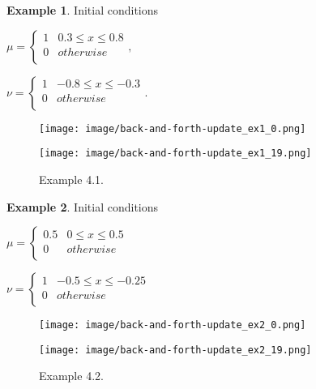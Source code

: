 \documentclass[a4j,10pt, twocolumn, dvipdfmx]{article}
\theoremstyle{definition}
\newtheorem{ex}{Example}[section]
\begin{document}
\begin{ex}
    Initial conditions

    $\mu = \left\{
        \begin{array}{ll}
            1 & 0.3 \le x \le 0.8\\
            0 & otherwise \\
        \end{array},
    \right.
    $

    $\nu = \left\{
        \begin{array}{ll}
            1 & - 0.8 \le x \le - 0.3 \\
            0 & otherwise \\
        \end{array}.
    \right.
    $


\end{ex}
\begin{figure}[htb]
    \begin{center}
        \begin{minipage}{0.45\hsize}
            \texttt{[image: image/back-and-forth-update\_ex1\_0.png]}
        \end{minipage}
        \begin{minipage}{0.45\hsize}
            \texttt{[image: image/back-and-forth-update\_ex1\_19.png]}
        \end{minipage}
    \end{center}
    \caption{Example 4.1.}
\end{figure}
\label{Example 1}

\begin{ex}
    Initial conditions

    $\mu = \left\{
        \begin{array}{ll}
            0.5 & 0 \le x \le 0.5 \\
            0 & otherwise \\
        \end{array}
    \right.
    $

    $\nu = \left\{
        \begin{array}{ll}
            1 & - 0.5 \le x \le - 0.25 \\
            0 & otherwise \\
        \end{array}
    \right.
    $

    \begin{figure}[htb]
        \begin{center}
            \begin{minipage}{0.45\hsize}
                \texttt{[image: image/back-and-forth-update\_ex2\_0.png]}
            \end{minipage}
            \begin{minipage}{0.45\hsize}
                \texttt{[image: image/back-and-forth-update\_ex2\_19.png]}
            \end{minipage}
        \end{center}
        \caption{Example 4.2.}
    \end{figure}

\end{ex}
\end{document}
